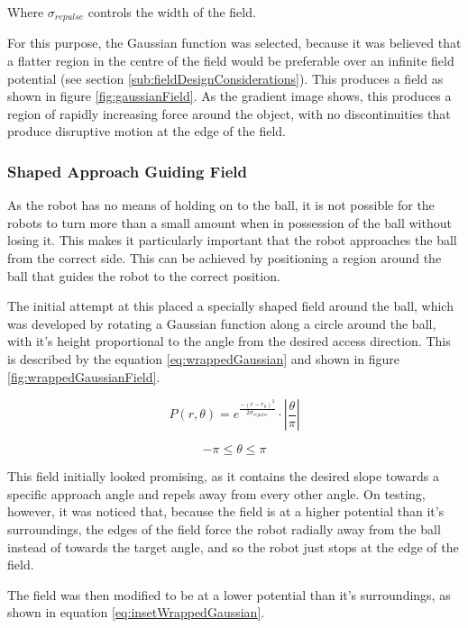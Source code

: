 \documentclass[10pt]{article}
\begin{document}
Where $\sigma_{repulse}$ controls the width of the field.

For this purpose, the Gaussian function was selected, because it was believed
that a flatter region in the centre of the field would be preferable over an
infinite field potential (see section \ref{sub:fieldDesignConsiderations}). This
produces a field as shown in figure \ref{fig:gaussianField}. As the gradient image shows, this produces a
region of rapidly increasing force around the object, with no discontinuities
that produce disruptive motion at the edge of the field.

\subsubsection{Shaped Approach Guiding Field\label{sub:Shaped-Approach-Guiding}}

As the robot has no means of holding on to the ball, it is not possible for the
robots to turn more than a small amount when in possession of the ball without
losing it. This makes it particularly important that the robot approaches the
ball from the correct side. This can be achieved by positioning a region around
the ball that guides the robot to the correct position.

The initial attempt at this placed a specially shaped field around the ball,
which was developed by rotating a Gaussian function along a circle around the
ball, with it's height proportional to the angle from the desired access
direction. This is described by the equation \ref{eq:wrappedGaussian} and shown
in figure \ref{fig:wrappedGaussianField}.

\begin{equation}
P\left(r,\theta\right)=e^{\frac{-\left(r-r_{0}\right)^{2}}{2\sigma_{repulse}}}\cdot\left|\frac{\theta}{\pi}\right|\label{eq:wrappedGaussian}
\end{equation}

\[
-\pi\leq\theta\leq\pi
\]

This field initially looked promising, as it contains the desired slope towards
a specific approach angle and repels away from every other angle. On testing,
however, it was noticed that, because the field is at a higher potential than
it's surroundings, the edges of the field force the robot radially away from the
ball instead of towards the target angle, and so the robot just stops at the
edge of the field.

The field was then modified to be at a lower potential than it's surroundings,
as shown in equation \ref{eq:insetWrappedGaussian}.
\end{document}
